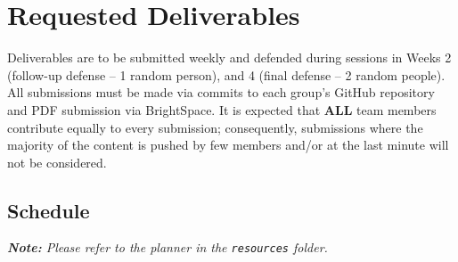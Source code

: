\documentclass[12pt]{article}
\begin{document}
\section{Requested Deliverables}
Deliverables are to be submitted weekly and defended during sessions in Weeks 2 (follow-up defense -- 1 random person), and 4 (final defense -- 2 random people). All submissions must be made via commits to each group's GitHub repository and PDF submission via BrightSpace\texttrademark. It is expected that \textbf{ALL} team members contribute equally to every submission; consequently, submissions where the majority of the content is pushed by few members and/or at the last minute will not be considered.

\subsection{Schedule}
  \textit{\textbf{Note:} Please refer to the planner in the \texttt{resources} folder.}
\end{document}
